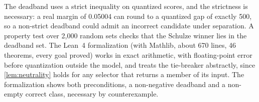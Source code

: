 The deadband uses a strict inequality on quantized scores, and the strictness is necessary: a real margin of 0.05004 can round to a quantized gap of exactly 500, so a non-strict deadband could admit an incorrect candidate under separation. A property test over 2,000 random sets checks that the Schulze winner lies in the deadband set. The Lean~4 formalization (with Mathlib, about 670 lines, 46 theorems, every goal proved) works in exact arithmetic, with floating-point error before quantization outside the model, and treats the tie-breaker abstractly, since \cref{lem:neutrality} holds for any selector that returns a member of its input. The formalization shows both preconditions, a non-negative deadband and a non-empty correct class, necessary by counterexample.

